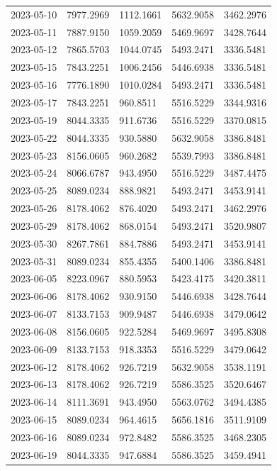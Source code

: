 {\begin{longtable}{lllll}
2023-05-10 & 7977.2969 & 1112.1661 & 5632.9058 & 3462.2976 \\
2023-05-11 & 7887.9150 & 1059.2059 & 5469.9697 & 3428.7644 \\
2023-05-12 & 7865.5703 & 1044.0745 & 5493.2471 & 3336.5481 \\
2023-05-15 & 7843.2251 & 1006.2456 & 5446.6938 & 3336.5481 \\
2023-05-16 & 7776.1890 & 1010.0284 & 5493.2471 & 3336.5481 \\
2023-05-17 & 7843.2251 & 960.8511 & 5516.5229 & 3344.9316 \\
2023-05-19 & 8044.3335 & 911.6736 & 5516.5229 & 3370.0815 \\
2023-05-22 & 8044.3335 & 930.5880 & 5632.9058 & 3386.8481 \\
2023-05-23 & 8156.0605 & 960.2682 & 5539.7993 & 3386.8481 \\
2023-05-24 & 8066.6787 & 943.4950 & 5516.5229 & 3487.4475 \\
2023-05-25 & 8089.0234 & 888.9821 & 5493.2471 & 3453.9141 \\
2023-05-26 & 8178.4062 & 876.4020 & 5493.2471 & 3462.2976 \\
2023-05-29 & 8178.4062 & 868.0154 & 5493.2471 & 3520.9807 \\
2023-05-30 & 8267.7861 & 884.7886 & 5493.2471 & 3453.9141 \\
2023-05-31 & 8089.0234 & 855.4355 & 5400.1406 & 3386.8481 \\
2023-06-05 & 8223.0967 & 880.5953 & 5423.4175 & 3420.3811 \\
2023-06-06 & 8178.4062 & 930.9150 & 5446.6938 & 3428.7644 \\
2023-06-07 & 8133.7153 & 909.9487 & 5446.6938 & 3479.0642 \\
2023-06-08 & 8156.0605 & 922.5284 & 5469.9697 & 3495.8308 \\
2023-06-09 & 8133.7153 & 918.3353 & 5516.5229 & 3479.0642 \\
2023-06-12 & 8178.4062 & 926.7219 & 5632.9058 & 3538.1191 \\
2023-06-13 & 8178.4062 & 926.7219 & 5586.3525 & 3520.6467 \\
2023-06-14 & 8111.3691 & 943.4950 & 5563.0762 & 3494.4385 \\
2023-06-15 & 8089.0234 & 964.4615 & 5656.1816 & 3511.9109 \\
2023-06-16 & 8089.0234 & 972.8482 & 5586.3525 & 3468.2305 \\
2023-06-19 & 8044.3335 & 947.6884 & 5586.3525 & 3459.4941 \\

\end{longtable}}
